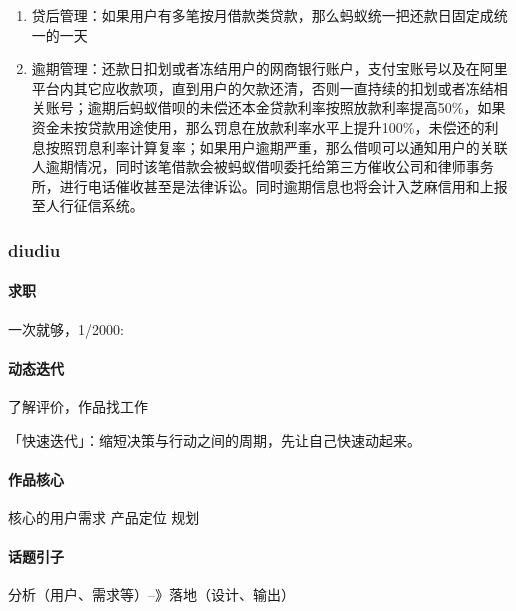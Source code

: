 \documentclass[letterpaper,10pt,english]{sphinxmanual}
\begin{document}
\begin{enumerate}
\item {} 
贷后管理：如果用户有多笔按月借款类贷款，那么蚂蚁统一把还款日固定成统一的一天

\item {} 
逾期管理：还款日扣划或者冻结用户的网商银行账户，支付宝账号以及在阿里平台内其它应收款项，直到用户的欠款还清，否则一直持续的扣划或者冻结相关账号；逾期后蚂蚁借呗的未偿还本金贷款利率按照放款利率提高50\%，如果资金未按贷款用途使用，那么罚息在放款利率水平上提升100\%，未偿还的利息按照罚息利率计算复率；如果用户逾期严重，那么借呗可以通知用户的关联人逾期情况，同时该笔借款会被蚂蚁借呗委托给第三方催收公司和律师事务所，进行电话催收甚至是法律诉讼。同时逾期信息也将会计入芝麻信用和上报至人行征信系统。

\end{enumerate}


\subsubsection{diudiu}
\label{\detokenize{chapter_experience/diudiu:diudiu}}\label{\detokenize{chapter_experience/diudiu::doc}}

\paragraph{求职}
\label{\detokenize{chapter_experience/diudiu:id1}}
一次就够，1/2000:


\paragraph{动态迭代}
\label{\detokenize{chapter_experience/diudiu:id2}}
了解评价，作品找工作

「快速迭代」：缩短决策与行动之间的周期，先让自己快速动起来。%
\begin{footnote}[690]\sphinxAtStartFootnote
{}
%
\end{footnote}


\paragraph{作品核心}
\label{\detokenize{chapter_experience/diudiu:id3}}
核心的用户需求 产品定位 规划


\paragraph{话题引子}
\label{\detokenize{chapter_experience/diudiu:id4}}
分析（用户、需求等）–》落地（设计、输出）
\end{document}
